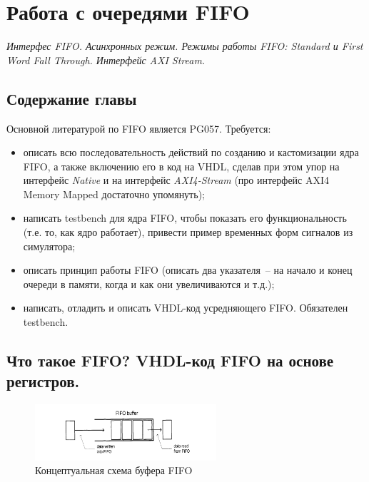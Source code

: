 
\hypersetup{pdfstartview=FitH,  linkcolor=linkcolor,urlcolor=urlcolor, colorlinks=true}

\chapter{Работа с очередями FIFO}

\emph{Интерфес FIFO. Асинхронных режим. Режимы работы FIFO: Standard и First Word Fall Through. Интерфейс AXI Stream.}

\section{Содержание главы}

Основной литературой по FIFO является PG057. Требуется:
\begin{itemize}
\item описать всю последовательность действий по созданию и кастомизации ядра FIFO, а также включению его в код на VHDL, сделав при этом упор на интерфейс \emph{Native} и на интерфейс \emph{AXI4-Stream} (про интерфейс AXI4 Memory Mapped достаточно упомянуть);
\item написать testbench для ядра FIFO, чтобы показать его функциональность (т.е. то, как ядро работает), привести пример временных форм сигналов из симулятора;
\item описать принцип работы FIFO (описать два указателя~-- на начало и конец очереди в памяти, когда и как они увеличиваются и т.д.);
\item написать, отладить и описать VHDL-код усредняющего FIFO. Обязателен testbench.
\end{itemize}

\section{Что такое FIFO? VHDL-код FIFO на основе \\  регистров.}

\begin{figure}[h]
\centering
\includegraphics[width=0.6\textwidth]{fifo_bufer}
\caption{Концептуальная схема буфера FIFO}
\label{fifo_bufer_label}
\end{figure}


